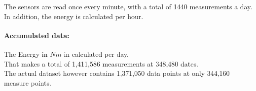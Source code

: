 \documentclass{scrartcl}
\begin{document}
The sensors are read once every minute, with a total of 1440 measurements a day. In addition, the energy is calculated per hour.\\

\paragraph{Accumulated data:}
The Energy in $Nm$ in calculated per day.\\

\noindent
That makes a total of 1,411,586 measurements at 348,480 dates.\\
The actual dataset however contains 1,371,050 data points at only 344,160 measure points.








%



%
\end{document}

